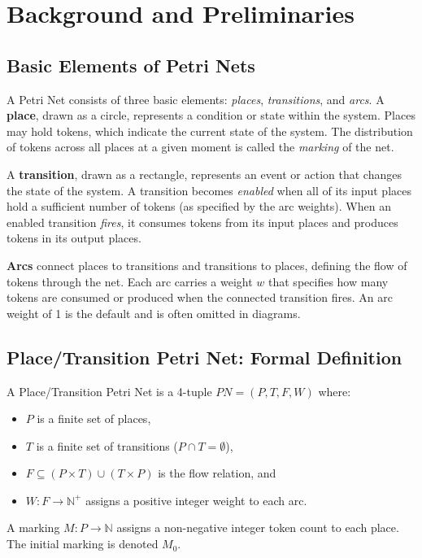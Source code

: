 \documentclass[conference,a4paper]{IEEEtran}
\begin{document}
\section{Background and Preliminaries}

\subsection{Basic Elements of Petri Nets}

A Petri Net consists of three basic elements: \emph{places},
\emph{transitions}, and \emph{arcs}. A \textbf{place}, drawn as a circle,
represents a condition or state within the system. Places may hold tokens,
which indicate the current state of the system. The distribution of tokens
across all places at a given moment is called the \emph{marking} of the net.

A \textbf{transition}, drawn as a rectangle, represents an event or action
that changes the state of the system. A transition becomes \emph{enabled}
when all of its input places hold a sufficient number of tokens (as specified
by the arc weights). When an enabled transition \emph{fires}, it consumes
tokens from its input places and produces tokens in its output places.

\textbf{Arcs} connect places to transitions and transitions to places,
defining the flow of tokens through the net. Each arc carries a weight $w$
that specifies how many tokens are consumed or produced when the connected
transition fires. An arc weight of 1 is the default and is often omitted in
diagrams.

\subsection{Place/Transition Petri Net: Formal Definition}

A Place/Transition Petri Net is a 4-tuple $PN = (P, T, F, W)$ where:
\begin{itemize}
  \item $P$ is a finite set of places,
  \item $T$ is a finite set of transitions ($P \cap T = \emptyset$),
  \item $F \subseteq (P \times T) \cup (T \times P)$ is the flow relation, and
  \item $W : F \rightarrow \mathbb{N}^{+}$ assigns a positive integer weight to each arc.
\end{itemize}
A marking $M : P \rightarrow \mathbb{N}$ assigns a non-negative integer
token count to each place. The initial marking is denoted $M_0$.
\end{document}
